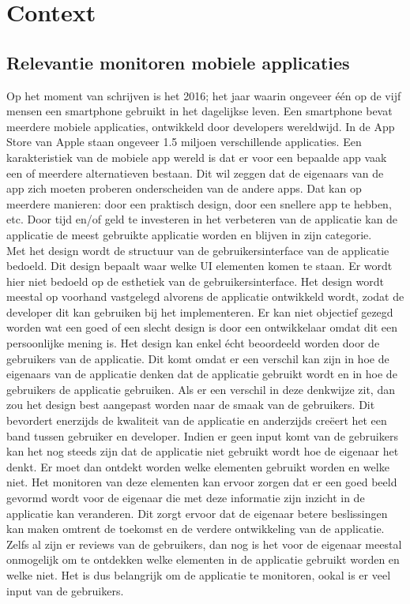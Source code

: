 \chapter{Context}

\section{Relevantie monitoren mobiele applicaties}
Op het moment van schrijven is het 2016; het jaar waarin ongeveer \'e\'en op de vijf mensen een smartphone gebruikt in het dagelijkse leven. Een smartphone bevat meerdere mobiele applicaties, ontwikkeld door developers wereldwijd. In de App Store van Apple staan ongeveer 1.5 miljoen verschillende applicaties. Een karakteristiek van de mobiele app wereld is dat er voor een bepaalde app vaak een of meerdere alternatieven bestaan. Dit wil zeggen dat de eigenaars van de app zich moeten proberen onderscheiden van de andere apps. Dat kan op meerdere manieren: door een praktisch design, door een snellere app te hebben, etc. Door tijd en/of geld te investeren in het verbeteren van de applicatie kan de applicatie de meest gebruikte applicatie worden en blijven in zijn categorie. \\

Met het design wordt de structuur van de gebruikersinterface van de applicatie bedoeld. Dit design bepaalt waar welke UI elementen komen te staan. Er wordt hier niet bedoeld op de esthetiek van de gebruikersinterface.
Het design wordt meestal op voorhand vastgelegd alvorens de applicatie ontwikkeld wordt, zodat de developer dit kan gebruiken bij het implementeren. Er kan niet objectief gezegd worden wat een goed of een slecht design is door een ontwikkelaar omdat dit een persoonlijke mening is. Het design kan enkel \'echt beoordeeld worden door de gebruikers van de applicatie. Dit komt omdat er een verschil kan zijn in hoe de eigenaars van de applicatie denken dat de applicatie gebruikt wordt en in hoe de gebruikers de applicatie gebruiken. Als er een verschil in deze denkwijze zit, dan zou het design best aangepast worden naar de smaak van de gebruikers. Dit bevordert enerzijds de kwaliteit van de applicatie en anderzijds cre\"eert het een band tussen gebruiker en developer. Indien er geen input komt van de gebruikers kan het nog steeds zijn dat de applicatie niet gebruikt wordt hoe de eigenaar het denkt. Er moet dan ontdekt worden welke elementen gebruikt worden en welke niet. Het monitoren van deze elementen kan ervoor zorgen dat er een goed beeld gevormd wordt voor de eigenaar die met deze informatie zijn inzicht in de applicatie kan veranderen. Dit zorgt ervoor dat de eigenaar betere beslissingen kan maken omtrent de toekomst en de verdere ontwikkeling van de applicatie. Zelfs al zijn er reviews van de gebruikers, dan nog is het voor de eigenaar meestal onmogelijk om te ontdekken welke elementen in de applicatie gebruikt worden en welke niet. Het is dus belangrijk om de applicatie te monitoren, ookal is er veel input van de gebruikers. \\


